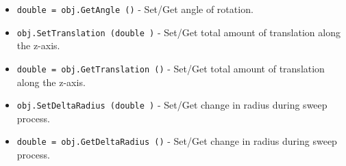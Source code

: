 \begin{itemize}
\item  \verb|double = obj.GetAngle ()| -  Set/Get angle of rotation.

\item  \verb|obj.SetTranslation (double )| -  Set/Get total amount of translation along the z-axis.

\item  \verb|double = obj.GetTranslation ()| -  Set/Get total amount of translation along the z-axis.

\item  \verb|obj.SetDeltaRadius (double )| -  Set/Get change in radius during sweep process.

\item  \verb|double = obj.GetDeltaRadius ()| -  Set/Get change in radius during sweep process.

\end{itemize}
